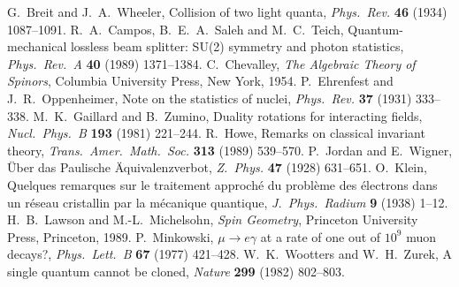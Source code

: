  G.~Breit and J.~A.~Wheeler, Collision of two light quanta, \emph{Phys.\ Rev.} \textbf{46} (1934) 1087--1091.
 R.~A.~Campos, B.~E.~A.~Saleh and M.~C.~Teich, Quantum-mechanical lossless beam splitter: SU(2) symmetry and photon statistics, \emph{Phys.\ Rev.\ A} \textbf{40} (1989) 1371--1384.
 C.~Chevalley, \emph{The Algebraic Theory of Spinors}, Columbia University Press, New York, 1954.
 P.~Ehrenfest and J.~R.~Oppenheimer, Note on the statistics of nuclei, \emph{Phys.\ Rev.} \textbf{37} (1931) 333--338.
 M.~K.~Gaillard and B.~Zumino, Duality rotations for interacting fields, \emph{Nucl.\ Phys.\ B} \textbf{193} (1981) 221--244.
 R.~Howe, Remarks on classical invariant theory, \emph{Trans.\ Amer.\ Math.\ Soc.} \textbf{313} (1989) 539--570.
 P.~Jordan and E.~Wigner, \"Uber das Paulische \"Aquivalenzverbot, \emph{Z.\ Phys.} \textbf{47} (1928) 631--651.
 O.~Klein, Quelques remarques sur le traitement approch\'e du probl\`eme des \'electrons dans un r\'eseau cristallin par la m\'ecanique quantique, \emph{J.\ Phys.\ Radium} \textbf{9} (1938) 1--12.
 H.~B.~Lawson and M.-L.~Michelsohn, \emph{Spin Geometry}, Princeton University Press, Princeton, 1989.
 P.~Minkowski, $\mu\to e\gamma$ at a rate of one out of $10^9$ muon decays?, \emph{Phys.\ Lett.\ B} \textbf{67} (1977) 421--428.
 W.~K.~Wootters and W.~H.~Zurek, A single quantum cannot be cloned, \emph{Nature} \textbf{299} (1982) 802--803.
